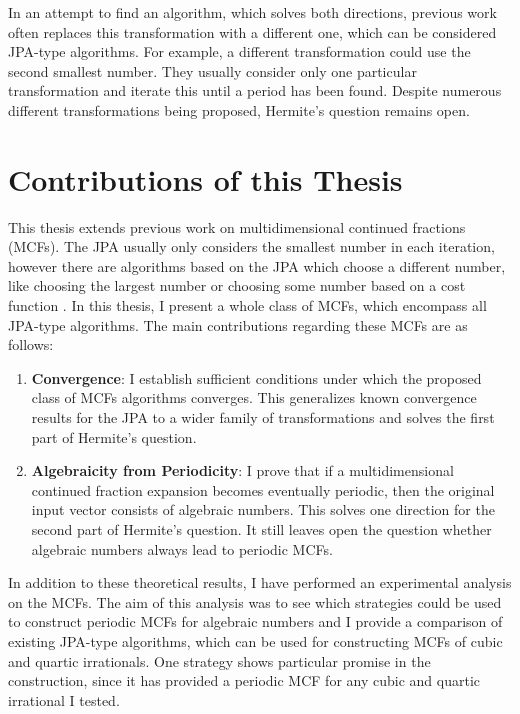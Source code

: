In an attempt to find an algorithm, which solves both directions,
previous work often replaces this transformation with a different one,
which can be considered JPA-type algorithms.
For example, a different transformation could use the second smallest number.
They usually consider only one particular transformation and iterate this until a period has been found.
Despite numerous different transformations being proposed,
Hermite's question remains open.

\section{Contributions of this Thesis}
\label{sec:contributions}

This thesis extends previous work on multidimensional continued fractions (MCFs).
The JPA usually only considers the smallest number in each iteration,
however there are algorithms based on the JPA which choose a different number,
like choosing the largest number \cite{Podsypanin77} or choosing some number
based on a cost function \cite{Tamura09}.
In this thesis, I present a whole class of MCFs,
which encompass all JPA-type algorithms.
The main contributions regarding these MCFs are as follows:
\begin{enumerate}
  \item \textbf{Convergence}:
    I establish sufficient conditions under which the proposed class of MCFs
    algorithms converges.
    This generalizes known convergence results for the JPA to a wider family of
    transformations and solves the first part of Hermite's question.
  \item \textbf{Algebraicity from Periodicity}:
    I prove that if a multidimensional continued fraction expansion becomes
    eventually periodic, then the original input vector consists of algebraic
    numbers.
    This solves one direction for the second part of Hermite's question.
    It still leaves open the question whether algebraic numbers always lead to
    periodic MCFs.
\end{enumerate}

In addition to these theoretical results,
I have performed an experimental analysis on the MCFs.
The aim of this analysis was to see which strategies could be used
to construct periodic MCFs for algebraic numbers
and I provide a comparison of existing JPA-type algorithms,
which can be used for constructing MCFs of cubic and quartic irrationals.
One strategy shows particular promise in the construction,
since it has provided a periodic MCF for any cubic and quartic irrational I tested.

